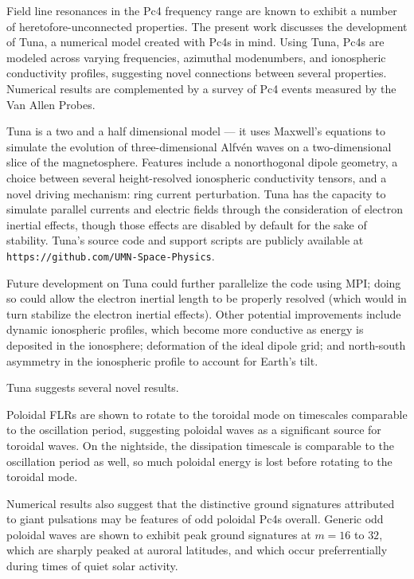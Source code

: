 \documentclass{article}
\newcommand{\Alfven}{Alfv\'en\xspace}
\newcommand{\maxeqs}{Maxwell's equations\xspace}
\newcommand{\azm}{\ensuremath{m}\xspace}
\begin{document}
Field line resonances in the Pc4 frequency range are known to exhibit a number of heretofore-unconnected properties. The present work discusses the development of Tuna, a numerical model created with Pc4s in mind. Using Tuna, Pc4s are modeled across varying frequencies, azimuthal modenumbers, and ionospheric conductivity profiles, suggesting novel connections between several properties. Numerical results are complemented by a survey of Pc4 events measured by the Van Allen Probes.


Tuna is a two and a half dimensional model --- it uses \maxeqs to simulate the evolution of three-dimensional \Alfven waves on a two-dimensional slice of the magnetosphere. Features include a nonorthogonal dipole geometry, a choice between several height-resolved ionospheric conductivity tensors, and a novel driving mechanism: ring current perturbation. Tuna has the capacity to simulate parallel currents and electric fields through the consideration of electron inertial effects, though those effects are disabled by default for the sake of stability. Tuna's source code and support scripts are publicly available at \texttt{https://github.com/UMN-Space-Physics}.

Future development on Tuna could further parallelize the code using MPI; doing so could allow the electron inertial length to be properly resolved (which would in turn stabilize the electron inertial effects). Other potential improvements include dynamic ionospheric profiles, which become more conductive as energy is deposited in the ionosphere; deformation of the ideal dipole grid; and north-south asymmetry in the ionospheric profile to account for Earth's tilt.


Tuna suggests several novel results.

Poloidal FLRs are shown to rotate to the toroidal mode on timescales comparable to the oscillation period, suggesting poloidal waves as a significant source for toroidal waves. On the nightside, the dissipation timescale is comparable to the oscillation period as well, so much poloidal energy is lost before rotating to the toroidal mode.

Numerical results also suggest that the distinctive ground signatures attributed to giant pulsations may be features of odd poloidal Pc4s overall. Generic odd poloidal waves are shown to exhibit peak ground signatures at ${\azm = 16}$ to $32$, which are sharply peaked at auroral latitudes, and which occur preferrentially during times of quiet solar activity.
\end{document}
